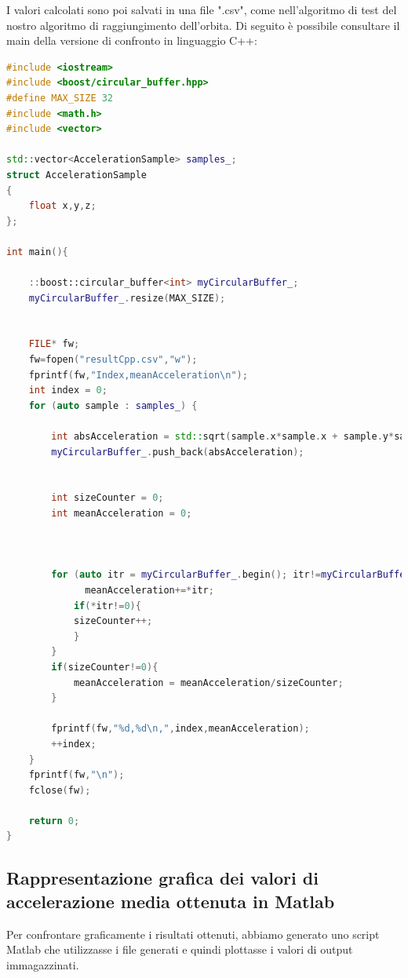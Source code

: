 \documentclass[LaM,binding=0.6cm]{../sapthesis}
\begin{document}
I valori calcolati sono poi salvati in una file ".csv", come nell'algoritmo di test del nostro algoritmo di raggiungimento dell'orbita.
\newline\newline
Di seguito è possibile consultare il main della versione di confronto in linguaggio C++:
\newline
\begin{lstlisting}[language=C++]
#include <iostream>
#include <boost/circular_buffer.hpp>
#define MAX_SIZE 32
#include <math.h>
#include <vector>

std::vector<AccelerationSample> samples_;
struct AccelerationSample
{
    float x,y,z;  
};

int main(){
    
    ::boost::circular_buffer<int> myCircularBuffer_;
    myCircularBuffer_.resize(MAX_SIZE);
    
    
    FILE* fw;
    fw=fopen("resultCpp.csv","w");
    fprintf(fw,"Index,meanAcceleration\n");
    int index = 0;
    for (auto sample : samples_) {
        
        int absAcceleration = std::sqrt(sample.x*sample.x + sample.y*sample.y + sample.z*sample.z);
        myCircularBuffer_.push_back(absAcceleration); 

        
        int sizeCounter = 0;
        int meanAcceleration = 0;
         
         
        
        for (auto itr = myCircularBuffer_.begin(); itr!=myCircularBuffer_.end() ; ++itr){
              meanAcceleration+=*itr;
            if(*itr!=0){
            sizeCounter++;
            }
        }
        if(sizeCounter!=0){
            meanAcceleration = meanAcceleration/sizeCounter;
        }
        
        fprintf(fw,"%d,%d\n,",index,meanAcceleration);
        ++index;
    }
    fprintf(fw,"\n");
    fclose(fw);
    
    return 0;
}

\end{lstlisting}

\newpage
\subsection{Rappresentazione grafica dei valori di accelerazione media ottenuta in Matlab}

Per confrontare graficamente i risultati ottenuti, abbiamo generato uno script Matlab che utilizzasse i file generati e quindi plottasse i valori di output immagazzinati.
\end{document}
